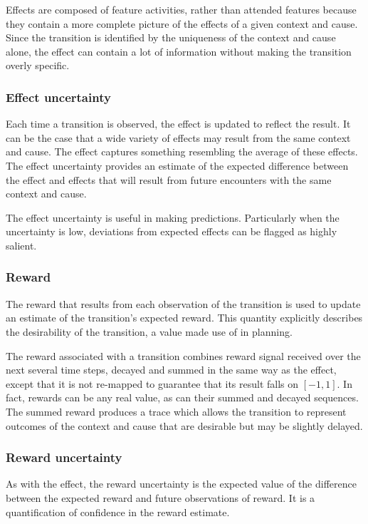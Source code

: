 Effects are composed of feature activities, rather than attended features because they contain a more complete picture of the effects of a given context and cause. Since the transition is identified by the uniqueness of the context and cause alone, the effect can contain a lot of information without making the transition overly specific. 

\subsubsection{Effect uncertainty}
Each time a transition is observed, the effect is updated to reflect the result. It can be the case that a wide variety of effects may result from the same context and cause. The effect captures something resembling the average of these effects. The effect uncertainty provides an estimate of the expected difference between the effect and effects that will result from future encounters with the same context and cause. 

The effect uncertainty is useful in making predictions. Particularly when the uncertainty is low, deviations from expected effects can be flagged as highly salient.

\subsubsection{Reward}
The reward that results from each observation of the transition is used to update an estimate of the transition's expected reward. This quantity explicitly describes the desirability of the transition, a value made use of in planning.

The reward associated with a transition combines reward signal received over the next several time steps, decayed and summed in the same way as the effect, except that it is not re-mapped to guarantee that its result falls on $[-1, 1]$. In fact, rewards can be any real value, as can their summed and decayed sequences. The summed reward produces a trace which allows the transition to represent outcomes of the context and cause that are desirable but may be slightly delayed. 

\subsubsection{Reward uncertainty}
As with the effect, the reward uncertainty is the expected value of the difference between the expected reward and future observations of reward. It is a quantification of confidence in the reward estimate.


